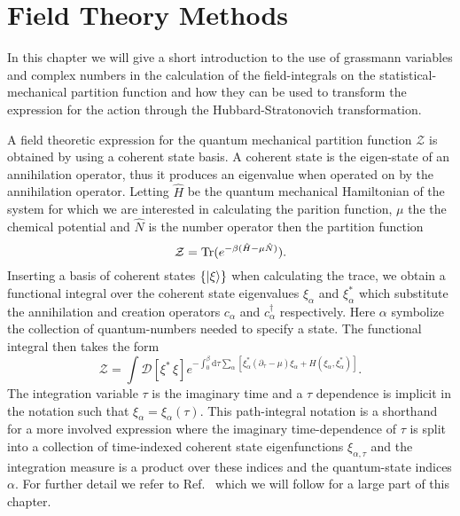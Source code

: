 \chapter{Field Theory Methods}
\label{chap:Field}

In this chapter we will give a short introduction to the use of grassmann variables
and complex numbers in the calculation of the field-integrals on the
statistical-mechanical partition function and how they can be used to transform the
expression for the action through the Hubbard-Stratonovich transformation.

A field theoretic expression for the quantum mechanical partition function $\mathcal{Z}$
is obtained by using a coherent state basis. A coherent state is the eigen-state of an annihilation operator, thus it
produces an eigenvalue when operated on by the annihilation operator. Letting $\hat{H}$ be the quantum mechanical
Hamiltonian of the system for which we are interested in calculating the parition function, $\mu$ the the chemical
potential and $\hat{N}$ is the number operator then the partition function
\begin{equation}
    \label{eq:Field:partitionFunction}
    \mathcal{Z} = \operatorname{Tr}(e^{-\beta(\hat{H}-\mu\hat{N})}).
\end{equation}
Inserting a basis of coherent states $\{\lvert \xi \rangle\}$ when calculating the trace, we obtain a functional integral over
the coherent state eigenvalues $\xi_\alpha$ and $\xi^\ast_\alpha$ which substitute the annihilation and creation operators
$c_\alpha$ and $c_\alpha^\dagger$ respectively. Here $\alpha$ symbolize the collection of quantum-numbers needed to specify
a state. The functional integral then takes the form
\begin{equation}
    \label{eq:Field:fieldPartition}
    \mathcal{Z} = \int\!\mathcal{D}[\xi^\ast\,\xi]e^{-\int_0^\beta\!\mathrm{d}\tau\sum_\alpha [\xi^\ast_\alpha(\partial_\tau-\mu)\xi_\alpha + H(\xi_\alpha,\xi_\alpha^\ast)]}.
\end{equation}
The integration variable $\tau$ is the imaginary time and a $\tau$ dependence is implicit in the notation such that $\xi_\alpha = \xi_\alpha(\tau)$.
This path-integral notation is a shorthand for a more involved expression where the imaginary time-dependence of $\tau$ is
split into a collection of time-indexed coherent state eigenfunctions $\xi_{\alpha,\tau}$ and the integration measure
is a product over these indices and the quantum-state indices $\alpha$. For further detail we refer to Ref.~\cite{NegeleOrland98}
which we will follow for a large part of this chapter.

